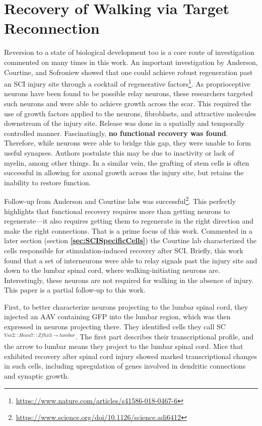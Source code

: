 \section{Recovery of Walking via Target Reconnection}

Reversion to a state of biological development too is a core route of investigation commented on many times in this work. An important investigation by Anderson, Courtine, and Sofroniew showed that one could achieve robust regeneration past an SCI injury site through a cocktail of regenerative factors\footnote{\url{https://www.nature.com/articles/s41586-018-0467-6}}. As proprioceptive neurons have been found to be possible relay neurons, these researchers targeted such neurons and were able to achieve growth across the scar. This required the use of growth factors applied to the neurons, fibroblasts, and attractive molecules downstream of the injury site. Release was done in a spatially and temporally controlled manner. Fascinatingly, \textbf{no functional recovery was found}. Therefore, while neurons were able to bridge this gap, they were unable to form useful synapses. Authors postulate this may be due to inactivity or lack of myelin, among other things. In a similar vein, the grafting of stem cells is often successful in allowing for axonal growth across the injury site, but retains the inability to restore function.\newline

Follow-up from Anderson and Courtine labs was successful\footnote{\url{https://www.science.org/doi/10.1126/science.adi6412}}. This perfectly highlights that functional recovery requires more than getting neurons to regenerate---it also requires getting them to regenerate in the right direction and make the right connections. That is a prime focus of this work. Commented in a later section (section \textbf{\ref{sec:SCISpecificCells}}) the Courtine lab characterized the cells responsible for stimulation-induced recovery after SCI. Briefly, this work found that a set of interneurons were able to relay signals past the injury site and down to the lumbar spinal cord, where walking-initiating neurons are. Interestingly, these neurons are not required for walking in the absence of injury. This paper is a partial follow-up to this work.\newline

First, to better characterize neurons projecting to the lumbar spinal cord, they injected an AAV containing GFP into the lumbar region, which was then expressed in neurons projecting there. They identified cells they call SC$^{Vsx2::Hoxa7::Zfhx3\rightarrow lumbar}$. The first part describes their transcriptional profile, and the arrow to lumbar means they project to the lumbar spinal cord. Mice that exhibited recovery after spinal cord injury showed marked transcriptional changes in such cells, including upregulation of genes involved in dendritic connections and synaptic growth.\newline

